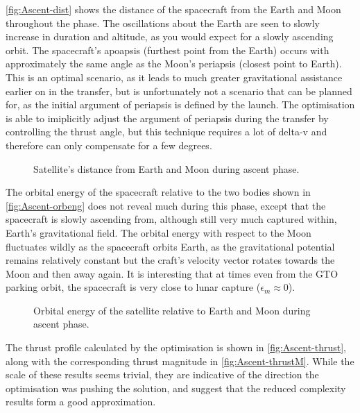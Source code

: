 \autoref{fig:Ascent-dist} shows the distance of the spacecraft from the Earth and Moon throughout the phase. The oscillations about the Earth are seen to slowly increase in duration and altitude, as you would expect for a slowly ascending orbit. The spacecraft's apoapsis (furthest point from the Earth) occurs with approximately the same angle as the Moon's periapsis (closest point to Earth). This is an optimal scenario, as it leads to much greater gravitational assistance earlier on in the transfer, but is unfortunately not a scenario that can be planned for, as the initial argument of periapsis is defined by the launch. The optimisation is able to imiplicitly adjust the argument of periapsis during the transfer by controlling the thrust angle, but this technique requires a lot of delta-v and therefore can only compensate for a few degrees.

\begin{figure}
\caption{Satellite's distance from Earth and Moon during ascent phase.} \label{fig:Ascent-dist}
\centering
\def\svgwidth{\figurewidth}

\end{figure}

The orbital energy of the spacecraft relative to the two bodies shown in \autoref{fig:Ascent-orbeng} does not reveal much during this phase, except that the spacecraft is slowly ascending from, although still very much captured within, Earth's gravitational field. The orbital energy with respect to the Moon fluctuates wildly as the spacecraft orbits Earth, as the gravitational potential remains relatively constant but the craft's velocity vector rotates towards the Moon and then away again. It is interesting that at times even from the GTO parking orbit, the spacecraft is very close to lunar capture ($\epsilon_m\approx0$).

\begin{figure}
\caption{Orbital energy of the satellite relative to Earth and Moon during ascent phase.} \label{fig:Ascent-orbeng}
\centering
\def\svgwidth{\figurewidth}

\end{figure}

The thrust profile calculated by the optimisation is shown in \autoref{fig:Ascent-thrust}, along with the corresponding thrust magnitude in \autoref{fig:Ascent-thrustM}. While the scale of these results seems trivial, they are indicative of the direction the optimisation was pushing the solution, and suggest that the reduced complexity results form a good approximation. 

